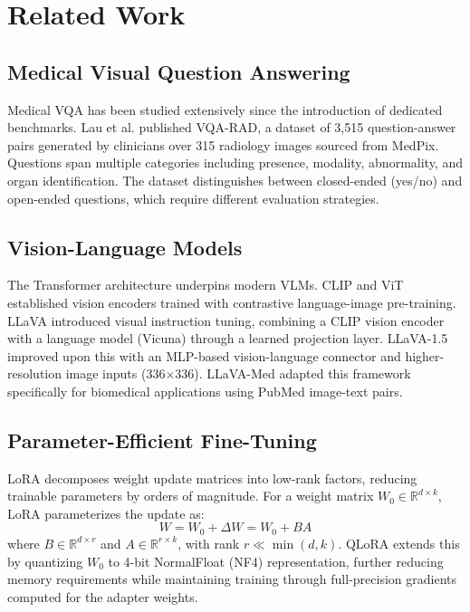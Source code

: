 \section{Related Work}
\label{sec:related_work}

\subsection{Medical Visual Question Answering}

Medical VQA has been studied extensively since the introduction of dedicated benchmarks. Lau et al. \cite{lau2018dataset} published VQA-RAD, a dataset of 3,515 question-answer pairs generated by clinicians over 315 radiology images sourced from MedPix. Questions span multiple categories including presence, modality, abnormality, and organ identification. The dataset distinguishes between closed-ended (yes/no) and open-ended questions, which require different evaluation strategies.

\subsection{Vision-Language Models}

The Transformer architecture \cite{vaswani2017attention} underpins modern VLMs. CLIP \cite{radford2021clip} and ViT \cite{dosovitskiy2021image} established vision encoders trained with contrastive language-image pre-training. LLaVA \cite{liu2023visual} introduced visual instruction tuning, combining a CLIP vision encoder with a language model (Vicuna) through a learned projection layer. LLaVA-1.5 \cite{liu2024improved} improved upon this with an MLP-based vision-language connector and higher-resolution image inputs (336$\times$336). LLaVA-Med \cite{li2023llavamed} adapted this framework specifically for biomedical applications using PubMed image-text pairs.

\subsection{Parameter-Efficient Fine-Tuning}

LoRA \cite{hu2022lora} decomposes weight update matrices into low-rank factors, reducing trainable parameters by orders of magnitude. For a weight matrix $W_0 \in \mathbb{R}^{d \times k}$, LoRA parameterizes the update as:
\begin{equation}
W = W_0 + \Delta W = W_0 + BA
\end{equation}
where $B \in \mathbb{R}^{d \times r}$ and $A \in \mathbb{R}^{r \times k}$, with rank $r \ll \min(d, k)$. QLoRA \cite{dettmers2024qlora} extends this by quantizing $W_0$ to 4-bit NormalFloat (NF4) representation, further reducing memory requirements while maintaining training through full-precision gradients computed for the adapter weights.
